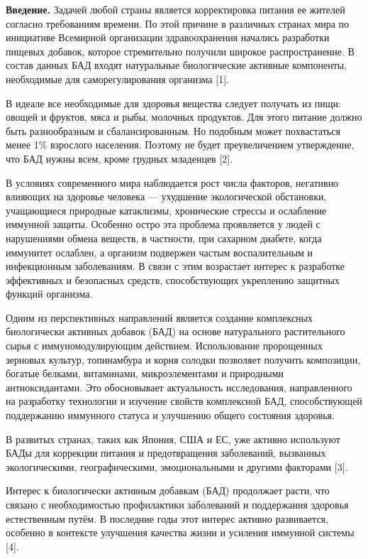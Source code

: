 \begin{multicols}{2}
{\bfseries Введение.} Задачей любой страны является корректировка питания
ее жителей согласно требованиям времени. По этой причине в различных
странах мира по инициативе Всемирной организации здравоохранения
начались разработки пищевых добавок, которое стремительно получили
широкое распространение. В состав данных БАД входят натуральные
биологические активные компоненты, необходимые для саморегулирования
организма {[}1{]}.

В идеале все необходимые для здоровья вещества следует получать из пищи:
овощей и фруктов, мяса и рыбы, молочных продуктов. Для этого питание
должно быть разнообразным и сбалансированным. Но подобным может
похвастаться менее 1\% взрослого населения. Поэтому не будет
преувеличением утверждение, что БАД нужны всем, кроме грудных младенцев
{[}2{]}.

В условиях современного мира наблюдается рост числа факторов, негативно
влияющих на здоровье человека --- ухудшение экологической обстановки,
учащающиеся природные катаклизмы, хронические стрессы и ослабление
иммунной защиты. Особенно остро эта проблема проявляется у людей с
нарушениями обмена веществ, в частности, при сахарном диабете, когда
иммунитет ослаблен, а организм подвержен частым воспалительным и
инфекционным заболеваниям. В связи с этим возрастает интерес к
разработке эффективных и безопасных средств, способствующих укреплению
защитных функций организма.

Одним из перспективных направлений является создание комплексных
биологически активных добавок (БАД) на основе натурального растительного
сырья с иммуномодулирующим действием. Использование пророщенных зерновых
культур, топинамбура и корня солодки позволяет получить композиции,
богатые белками, витаминами, микроэлементами и природными
антиоксидантами. Это обосновывает актуальность исследования,
направленного на разработку технологии и изучение свойств комплексной
БАД, способствующей поддержанию иммунного статуса и улучшению общего
состояния здоровья.

В развитых странах, таких как Япония, США и ЕС, уже активно используют
БАДы для коррекции питания и предотвращения заболеваний, вызванных
экологическими, географическими, эмоциональными и другими факторами
{[}3{]}.

Интерес к биологически активным добавкам (БАД) продолжает расти, что
связано с необходимостью профилактики заболеваний и поддержания здоровья
естественным путём. В последние годы этот интерес активно развивается,
особенно в контексте улучшения качества жизни и усиления иммунной
системы {[}4{]}.


\end{multicols}
